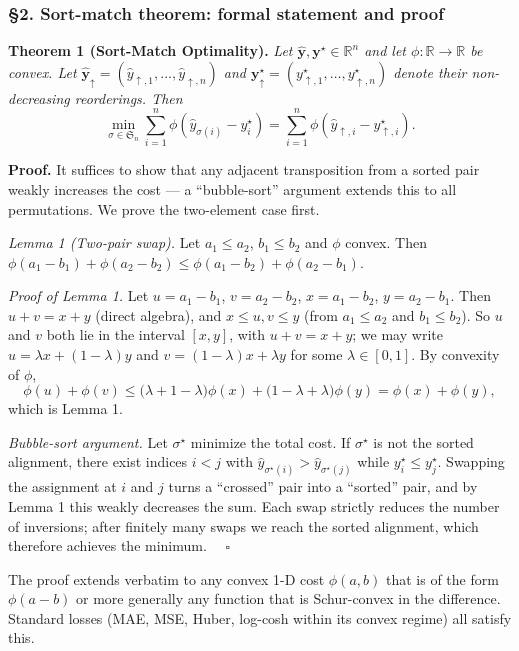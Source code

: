 \documentclass[
]{article}
\begin{document}
\subsubsection{§2. Sort-match theorem: formal statement and
proof}\label{sort-match-theorem-formal-statement-and-proof}

\textbf{Theorem 1 (Sort-Match Optimality).} \emph{Let
\(\hat{\mathbf{y}},\mathbf{y}^\star\in\mathbb{R}^n\) and let
\(\phi:\mathbb{R}\to\mathbb{R}\) be convex. Let
\(\hat{\mathbf{y}}_\uparrow=(\hat{y}_{\uparrow,1},\ldots,\hat{y}_{\uparrow,n})\)
and
\(\mathbf{y}^\star_\uparrow=(y^\star_{\uparrow,1},\ldots,y^\star_{\uparrow,n})\)
denote their non-decreasing reorderings. Then}
\[\min_{\sigma\in\mathfrak{S}_n}\sum_{i=1}^n \phi\!\left(\hat{y}_{\sigma(i)}-y_i^\star\right)=\sum_{i=1}^n \phi\!\left(\hat{y}_{\uparrow,i}-y^\star_{\uparrow,i}\right).\]

\textbf{Proof.} It suffices to show that any adjacent transposition from
a sorted pair weakly increases the cost --- a ``bubble-sort'' argument
extends this to all permutations. We prove the two-element case first.

\emph{Lemma 1 (Two-pair swap).} Let \(a_1\leq a_2\), \(b_1\leq b_2\) and
\(\phi\) convex. Then
\(\phi(a_1-b_1)+\phi(a_2-b_2)\leq\phi(a_1-b_2)+\phi(a_2-b_1)\).

\emph{Proof of Lemma 1.} Let \(u=a_1-b_1\), \(v=a_2-b_2\),
\(x=a_1-b_2\), \(y=a_2-b_1\). Then \(u+v=x+y\) (direct algebra), and
\(x\leq u,v\leq y\) (from \(a_1\leq a_2\) and \(b_1\leq b_2\)). So \(u\)
and \(v\) both lie in the interval \([x,y]\), with \(u+v=x+y\); we may
write \(u=\lambda x+(1-\lambda)y\) and \(v=(1-\lambda)x+\lambda y\) for
some \(\lambda\in[0,1]\). By convexity of \(\phi\),
\[\phi(u)+\phi(v)\leq \big(\lambda+1-\lambda\big)\phi(x)+\big(1-\lambda+\lambda\big)\phi(y)=\phi(x)+\phi(y),\]
which is Lemma 1.

\emph{Bubble-sort argument.} Let \(\sigma^\star\) minimize the total
cost. If \(\sigma^\star\) is not the sorted alignment, there exist
indices \(i<j\) with
\(\hat{y}_{\sigma^\star(i)}>\hat{y}_{\sigma^\star(j)}\) while
\(y_i^\star\leq y_j^\star\). Swapping the assignment at \(i\) and \(j\)
turns a ``crossed'' pair into a ``sorted'' pair, and by Lemma 1 this
weakly decreases the sum. Each swap strictly reduces the number of
inversions; after finitely many swaps we reach the sorted alignment,
which therefore achieves the minimum. \(\quad\square\)

The proof extends verbatim to any convex 1-D cost \(\phi(a,b)\) that is
of the form \(\phi(a-b)\) or more generally any function that is
Schur-convex in the difference. Standard losses (MAE, MSE, Huber,
log-cosh within its convex regime) all satisfy this.
\end{document}
